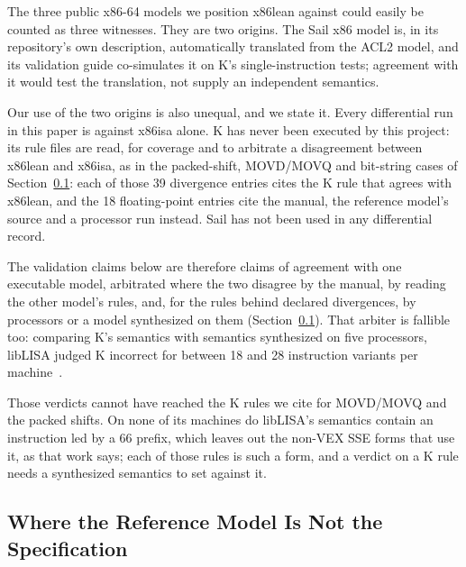 \documentclass[runningheads]{llncs}
\newcommand{\src}[1]{}  %
\begin{document}
The three public x86-64 models we position x86lean against could easily be counted as three witnesses. They are
two origins. The Sail x86 model is, in its repository's own description, automatically translated from the
ACL2 model, and its validation guide co-simulates it on K's single-instruction tests; agreement
with it would test the translation, not supply an independent semantics.
\src{docs/TACAS-G1-POSITIONING.md 1c.5 and 1c.7}
Our use of the two origins is also unequal, and we state it. Every differential run in this paper is
against x86isa alone. K has never been executed by this project: its rule files are read, for coverage
and to arbitrate a disagreement between x86lean and x86isa, as in the packed-shift, MOVD/MOVQ and bit-string cases of Section~\ref{sec:validation:limits}: each of those 39 divergence entries cites the K rule that agrees with x86lean, and the 18 floating-point entries cite the manual, the reference model's source and a processor run instead. Sail has not been used in any differential record.
\src{PROVENANCE.md, the K and Sail rows; docs/TACAS-G1-POSITIONING.md, the executable row and 1c.7;
Main.lean knownDivergences, the source field of every entry}
The validation claims below are therefore claims of agreement with one executable model, arbitrated
where the two disagree by the manual, by reading the other model's rules, and, for the rules behind
declared divergences, by processors or a model synthesized on them (Section~\ref{sec:validation:limits}). That arbiter is fallible
too: comparing K's semantics with semantics synthesized on five processors, libLISA judged K incorrect for
between 18 and 28 instruction variants per machine~\cite{liblisa}.
\src{docs/CLAIMS.tsv[liblisa\_k\_incorrect\_min, liblisa\_k\_incorrect\_max]; liblisa.nl/publications/liblisa-oopsla24/05-results, section 5.2.2 comparison table, row
``Dasgupta et al.\ incorrect'': 28 24 18 18 18, read 2026-09-12; docs/TACAS-G1-POSITIONING.md 1d}
Those verdicts cannot have reached the K rules we cite for MOVD/MOVQ and the packed shifts. On none of its machines do libLISA's semantics contain
an instruction led by a 66 prefix, which leaves out the non-VEX SSE forms that use it, as that work says;
each of those rules is such a form, and a verdict on a K rule needs a synthesized
semantics to set against it.
\src{liblisa.nl/publications/liblisa-oopsla24/05-results, section 5.2.2, ``Out-of-scope'', read 2026-09-12;
docs/LIBLISA-HARDWARE-CHECK-2026-09-12.md, the prefix census over all five machines; docs/DECISIONS.md D221}

\subsection{Where the Reference Model Is Not the Specification}
\label{sec:validation:limits}
\end{document}
